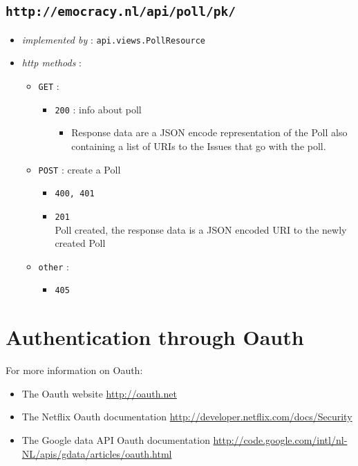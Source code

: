 \documentclass[a4paper]{report}
\begin{document}
\subsection{\texttt{http://emocracy.nl/api/poll/pk/}}
\begin{itemize}
    \item{\textsl{implemented by} : \texttt{api.views.PollResource}}
    \item{\textsl{http methods} :
        \begin{itemize}
            \item{\texttt{GET} :
                \begin{itemize}
                    \item{\texttt{200} : info about poll
                    \begin{itemize}
                        \item{Response data are a JSON encode representation of
                        the Poll also containing a list of URIs to the Issues 
                        that go with the poll.}
                    \end{itemize}                    
                    }
                \end{itemize}
            }
            \item{\texttt{POST} : create a Poll
                \begin{itemize}
                    \item{\texttt{400, 401}}
                    \item{\texttt{201}\\
                    Poll created, the response data is a JSON encoded URI to the
                    newly created Poll}
                \end{itemize}
            }
            
            \item{\texttt{other} :
                \begin{itemize}
                    \item{\texttt{405}}
                \end{itemize}
            }
        \end{itemize}
    }
\end{itemize}



\section{Authentication through Oauth}
For more information on Oauth:
\begin{itemize}
    \item{The Oauth website \url{http://oauth.net}}
    \item{The Netflix Oauth documentation \url{http://developer.netflix.com/docs/Security}}
    \item{The Google data API Oauth documentation \url{http://code.google.com/intl/nl-NL/apis/gdata/articles/oauth.html}}
\end{itemize}
\end{document}
